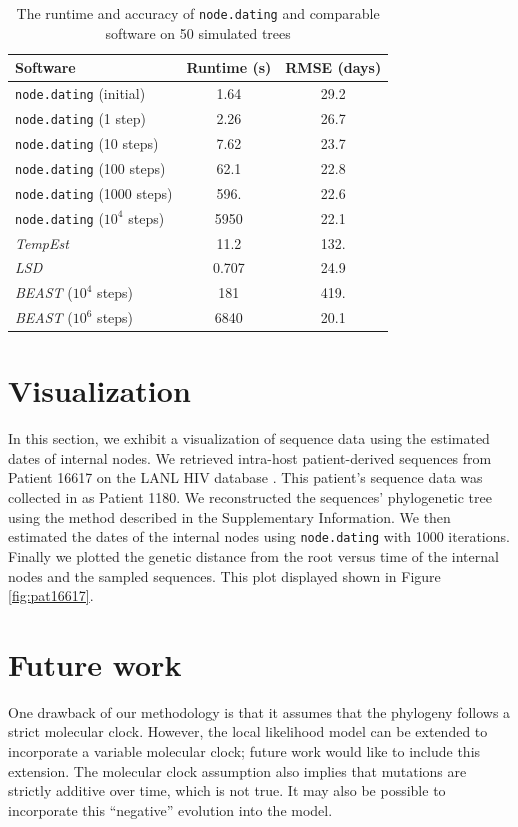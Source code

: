 \documentclass{bioinfo}
\newcommand{\code}[1]{{\tt #1}}
\begin{document}
\begin{table}[t]
	\caption[Runtime and accuracy]{The runtime and accuracy of \code{node.dating} and comparable software on 50 simulated trees}
	\label{tab:runtime}
	\centering
	\begin{tabular}{lcc}
		\hline
		Software & Runtime (s) & RMSE (days) \\
		\hline
		\code{node.dating} (initial) & 1.64 & 29.2 \\
		\code{node.dating} (1 step) & 2.26 & 26.7 \\
		\code{node.dating} (10 steps) & 7.62 & 23.7 \\
		\code{node.dating} (100 steps) & 62.1 & 22.8 \\
		\code{node.dating} (1000 steps) & 596. & 22.6 \\
		\code{node.dating} ($10^4$ steps) & 5950 & 22.1 \\
		\emph{TempEst} & 11.2 & 132. \\
		\emph{LSD} & 0.707 & 24.9 \\
		\emph{BEAST} ($10^4$ steps) & 181 & 419. \\
		\emph{BEAST} ($10^6$ steps) & 6840 & 20.1 \\
		\hline
	\end{tabular}
\end{table}

\section{Visualization} \label{sec:vis}
In this section, we exhibit a visualization of sequence data using the estimated dates of internal nodes.
We retrieved intra-host patient-derived sequences from Patient 16617 on the LANL HIV database \citep{LosAlamos}.
This patient's sequence data was collected in \cite{Llewellyn06} as Patient 1180.
We reconstructed the sequences' phylogenetic tree using the method described in the Supplementary Information.
We then estimated the dates of the internal nodes using \code{node.dating} with 1000 iterations. Finally we plotted the genetic distance from the root versus time of the internal nodes and the sampled sequences. This plot displayed shown in Figure \ref{fig:pat16617}.

\section{Future work} \label{sec:discuss}
One drawback of our methodology is that it assumes that the phylogeny follows a strict molecular clock.
However, the local likelihood model can be extended to incorporate a variable molecular clock; future work would like to include this extension.
The molecular clock assumption also implies that mutations \showthe\parskip are strictly additive over time, which is not true.
It may also be possible to incorporate this ``negative'' evolution into the model.
\end{document}
